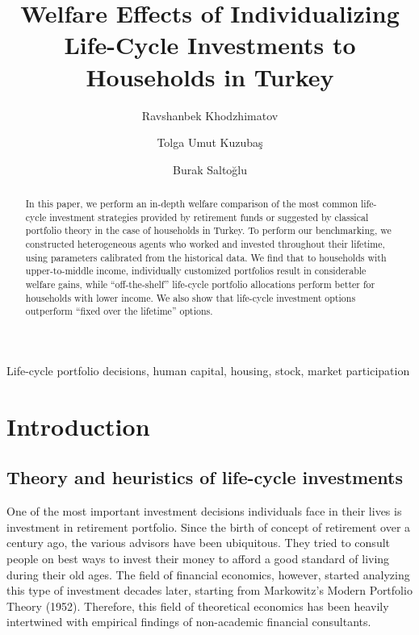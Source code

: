 \documentclass[review]{elsarticle}
\begin{document}
\begin{frontmatter}


\title{Welfare Effects of Individualizing Life-Cycle Investments to Households in Turkey}


\author{Ravshanbek Khodzhimatov}
\author{Tolga Umut Kuzubaş}
\author{Burak Saltoğlu}

\address{Boğaziçi University, Department of Economics, Natuk Birkan Building, 34342 Bebek, Istanbul, Turkey}


\begin{abstract}
In this paper, we perform an in-depth welfare comparison of the most common life-cycle investment strategies provided by retirement funds or suggested by classical portfolio theory in the case of households in Turkey. To perform our benchmarking, we constructed heterogeneous agents who worked and invested throughout their lifetime, using parameters calibrated from the historical data. We find that to households with upper-to-middle income, individually customized portfolios result in considerable welfare gains, while ``off-the-shelf'' life-cycle portfolio allocations perform better for households with lower income. We also show that life-cycle investment options outperform ``fixed over the lifetime'' options. 
\end{abstract}


\begin{keyword}
	Life-cycle portfolio decisions, human capital, housing, stock, market participation
\end{keyword}


\end{frontmatter}


\section{Introduction} %
\label{intro} %


\subsection{Theory and heuristics of life-cycle investments}
One of the most important investment decisions individuals face in their lives is investment in retirement portfolio. Since the birth of concept of retirement over a century ago, the various advisors have been ubiquitous. They tried to consult people on best ways to invest their money to afford a good standard of living during their old ages. The field of financial economics, however, started analyzing this type of investment decades later, starting from Markowitz's Modern Portfolio Theory (1952). Therefore, this field of theoretical economics has been heavily intertwined with empirical findings of non-academic financial consultants.
\end{document}
